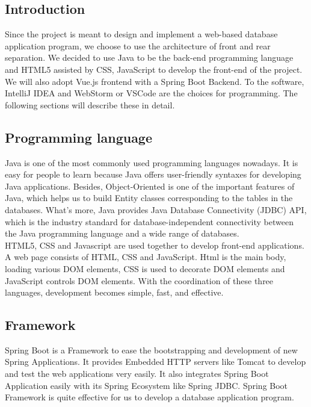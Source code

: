 \documentclass[]{article}
\begin{document}
	\subsection{Introduction}
	
	Since the project is meant to design and implement a web-based database application program, we choose to use the architecture of front and rear separation. We decided to use Java to be the back-end programming language and HTML5 assisted by CSS, JavaScript to develop the front-end of the project. We will also adopt Vue.js frontend with a Spring Boot Backend. To the software, IntelliJ IDEA and WebStorm or VSCode are the choices for programming. The following sections will describe these in detail. 

	\subsection{Programming language}
	
	\noindent Java is one of the most commonly used programming languages nowadays. It is easy for people to learn because Java offers user-friendly syntaxes for developing Java applications. Besides, Object-Oriented is one of the important features of Java, which helps us to build Entity classes corresponding to the tables in the databases. What's more, Java provides Java Database Connectivity (JDBC) API, which is the industry standard for database-independent connectivity between the Java programming language and a wide range of databases. \\
	
	\noindent HTML5, CSS and Javascript are used together to develop front-end applications. A web page consists of HTML, CSS and JavaScript. Html is the main body, loading various DOM elements, CSS is used to decorate DOM elements and JavaScript controls DOM elements. With the coordination of these three languages, development becomes simple, fast, and effective. 

	\subsection{Framework}
	
	\noindent Spring Boot is a Framework to ease the bootstrapping and development of new Spring Applications. It provides Embedded HTTP servers like Tomcat to develop and test the web applications very easily. It also integrates Spring Boot Application easily with its Spring Ecosystem like Spring JDBC. Spring Boot Framework is quite effective for us to develop a database application program. \\
	
\end{document}
